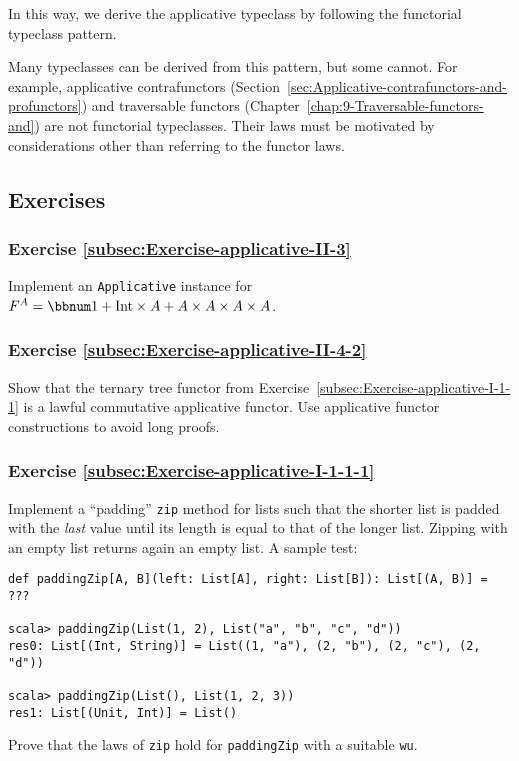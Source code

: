 In this way, we derive the applicative typeclass by following the
functorial typeclass pattern. 

Many typeclasses can be derived from this pattern, but some cannot.
For example, applicative contrafunctors (Section~\ref{sec:Applicative-contrafunctors-and-profunctors})
and traversable functors (Chapter~\ref{chap:9-Traversable-functors-and})
are not functorial typeclasses. Their laws must be motivated by considerations
other than referring to the functor laws.

\subsection{Exercises}

\subsubsection{Exercise \label{subsec:Exercise-applicative-II-3}\ref{subsec:Exercise-applicative-II-3}}

Implement an \lstinline!Applicative! instance for $F^{A}=\bbnum 1+\text{Int}\times A+A\times A\times A\times A$.

\subsubsection{Exercise \label{subsec:Exercise-applicative-II-4-2}\ref{subsec:Exercise-applicative-II-4-2}}

Show that the ternary tree functor from Exercise~\ref{subsec:Exercise-applicative-I-1-1}
is a lawful commutative applicative functor. Use applicative functor
constructions to avoid long proofs.

\subsubsection{Exercise \label{subsec:Exercise-applicative-I-1-1-1}\ref{subsec:Exercise-applicative-I-1-1-1}}

Implement a \textsf{``}padding\textsf{''} \lstinline!zip! method for lists such that
the shorter list is padded with the \emph{last} value until its length
is equal to that of the longer list. Zipping with an empty list returns
again an empty list. A sample test:
\begin{lstlisting}
def paddingZip[A, B](left: List[A], right: List[B]): List[(A, B)] = ???

scala> paddingZip(List(1, 2), List("a", "b", "c", "d"))
res0: List[(Int, String)] = List((1, "a"), (2, "b"), (2, "c"), (2, "d"))

scala> paddingZip(List(), List(1, 2, 3))
res1: List[(Unit, Int)] = List()
\end{lstlisting}
Prove that the laws of \lstinline!zip! hold for \lstinline!paddingZip!
with a suitable \lstinline!wu!.

